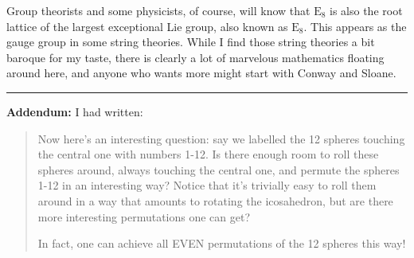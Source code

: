\documentclass[12pt]{article}
\begin{document}
Group theorists and some physicists, of course, will know that
\(\mathrm{E}_8\) is also the root lattice of the largest exceptional Lie
group, also known as \(\mathrm{E}_8\). This appears as the gauge group
in some string theories. While I find those string theories a bit
baroque for my taste, there is clearly a lot of marvelous mathematics
floating around here, and anyone who wants more might start with Conway
and Sloane.

\begin{center}\rule{0.5\linewidth}{0.5pt}\end{center}

\textbf{Addendum:} I had written:

\begin{quote}
Now here's an interesting question: say we labelled the 12 spheres
touching the central one with numbers 1-12. Is there enough room to roll
these spheres around, always touching the central one, and permute the
spheres 1-12 in an interesting way? Notice that it's trivially easy to
roll them around in a way that amounts to rotating the icosahedron, but
are there more interesting permutations one can get?

In fact, one can achieve all EVEN permutations of the 12 spheres this
way!
\end{quote}
\end{document}
